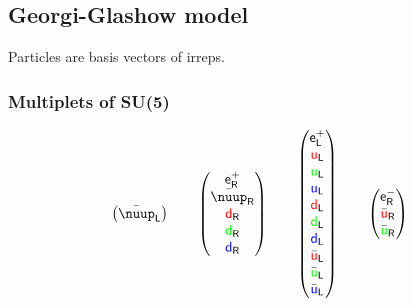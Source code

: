 \documentclass[english, fleqn]{beamer}
\begin{document}
\subsection{Georgi-Glashow model}

\begin{frame}
    Particles are basis vectors of irreps.
\end{frame}

\begin{frame}
    \frametitle{Multiplets of SU(5)}
    \[
        \begin{pmatrix}
            \bar\nuup_\mathsf L
        \end{pmatrix}
        \qquad
        \begin{pmatrix}
            \mathsf e^+_\mathsf R \\
            \bar\nuup_\mathsf R \\
            \textcolor{red}  {\mathsf d}_\mathsf R \\
            \textcolor{green}{\mathsf d}_\mathsf R \\
            \textcolor{blue} {\mathsf d}_\mathsf R
        \end{pmatrix}
        \qquad
        \begin{pmatrix}
            \mathsf e^+_\mathsf L \\
            \textcolor{red}  {\mathsf u}_\mathsf L \\
            \textcolor{green}{\mathsf u}_\mathsf L \\
            \textcolor{blue} {\mathsf u}_\mathsf L \\
            \textcolor{red}  {\mathsf d}_\mathsf L \\
            \textcolor{green}{\mathsf d}_\mathsf L \\
            \textcolor{blue} {\mathsf d}_\mathsf L \\
            \bar{\textcolor{red}  {\mathsf u}}_\mathsf L \\
            \bar{\textcolor{green}{\mathsf u}}_\mathsf L \\
            \bar{\textcolor{blue} {\mathsf u}}_\mathsf L
        \end{pmatrix}
        \qquad
        \begin{pmatrix}
            \mathsf e^-_\mathsf R \\
            \bar{\textcolor{red}  {\mathsf u}}_\mathsf R \\
            \bar{\textcolor{green}{\mathsf u}}_\mathsf R \\

\end{pmatrix}\]
\end{frame}
\end{document}
